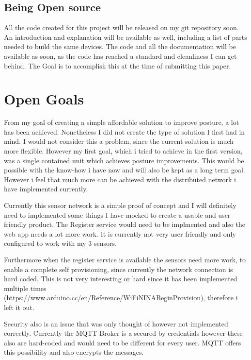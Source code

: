 \subsection{Being Open source}

All the code created for this project will be released on my git repository soon. An introduction and explanation will be available as well, including a list of parts needed to build the same devices. The code and all the documentation will be available as soon, as the code has reached a standard and cleanliness I can get behind. The Goal is to accomplish this at the time of submitting this paper.

\section{Open Goals}

From my goal of creating a simple affordable solution to improve posture, a lot has been achieved. Nonetheless I did not create the type of solution I first had in mind. I would not consider this a problem, since the current solution is much more flexible. However my first goal, which i tried to achieve in the first version, was a single contained unit which achieves posture improvements. This would be possible with the know-how i have now and will also be kept as a long term goal. However i feel that much more can be achieved with the distributed network i have implemented currently. 

Currently this sensor network is a simple proof of concept and I will definitely need to implemented some things I have mocked to create a usable and user friendly product.  The Register service would need to be implmented and also the web app needs a lot more work. It is currently not very user friendly and only configured to work with my 3 sensors. 

Furthermore when the register service is available the sensors need more work, to enable a complete self provisioning, since currently the network connection is hard coded. This is not very interesting or hard since it has been implemented multiple times (https://www.arduino.cc/en/Reference/WiFiNINABeginProvision), therefore i left it out. 

Security also is an issue that was only thought of however not implemented correctly. Currently the MQTT Broker is a secured by credentials however these also are hard-coded and would need to be different for every user. MQTT offers this possibility and also encrypts the messages.

